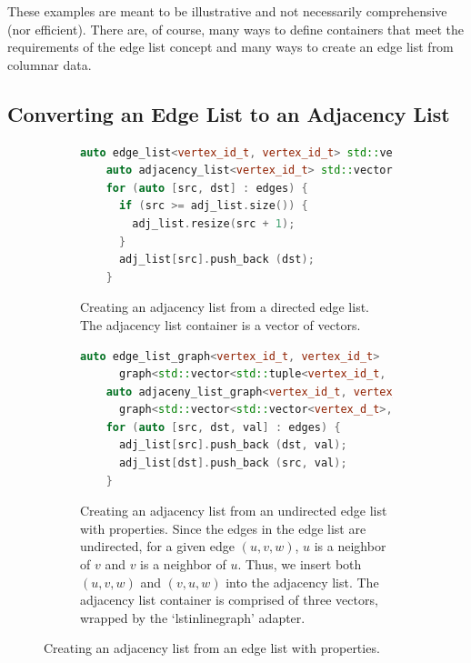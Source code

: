 These examples are meant to be illustrative and not necessarily
comprehensive (nor efficient).
There are, of course, many ways to define containers that meet the
requirements of the edge list concept and many ways to
create an edge list from columnar data.

\subsection{Converting an Edge List to an Adjacency List}

\begin{figure}[ht]
  \begin{center}
    \begin{subfigure}{0.48\textwidth}
      \begin{lstlisting}[language=C++]
    auto edge_list<vertex_id_t, vertex_id_t> std::vector<std::tuple<vertex_id_t, vertex_id_t> edges;
    auto adjacency_list<vertex_id_t> std::vector<std::vector<vertex_d_t>> adj_list;
    for (auto [src, dst] : edges) {
      if (src >= adj_list.size()) {
        adj_list.resize(src + 1);
      }
      adj_list[src].push_back (dst);
    }
      \end{lstlisting}
      \caption{Creating an adjacency list from a directed edge list.
      The adjacency list container is a vector of vectors.
      \label{subfig:adj_list_from_directed_edge_list}}
    \end{subfigure}
    \begin{subfigure}{0.48\textwidth}
      \begin{lstlisting}[language=C++]
    auto edge_list_graph<vertex_id_t, vertex_id_t>
      graph<std::vector<std::tuple<vertex_id_t, vertex_id_t>> edges;
    auto adjaceny_list_graph<vertex_id_t, vertex_id_t, double>
      graph<std::vector<std::vector<vertex_d_t>, std::vector<double>> adj_list{edges.num_vertices()};
    for (auto [src, dst, val] : edges) {
      adj_list[src].push_back (dst, val);
      adj_list[dst].push_back (src, val);
    }
      \end{lstlisting}
      \caption{Creating an adjacency list from an undirected edge list with properties.
      Since the edges in the edge list are undirected, for a given edge $(u, v, w)$,
        $u$ is a neighbor of $v$ and $v$ is a neighbor of $u$. Thus, we insert both
        $(u, v, w)$ and $(v, u, w)$ into the adjacency list.
        The adjacency list container is comprised of three vectors, wrapped by
        the `lstinline{graph}' adapter.
        \label{subfig:adj_list_from_undirected_edge_list}}
    \end{subfigure}
    \caption{Creating an adjacency list from an edge list with properties.\label{fig:adj_list_from_edge_list}}
  \end{center}
\end{figure}

